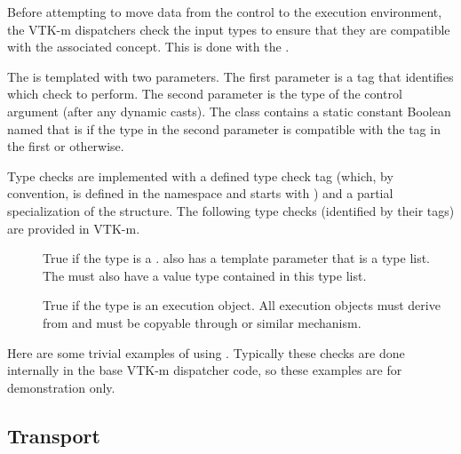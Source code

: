 
Before attempting to move data from the control to the execution
environment, the VTK-m dispatchers check the input types to ensure that
they are compatible with the associated \controlsignature concept. This is
done with the  .

The   is templated with two
parameters. The first parameter is a tag that identifies which check to
perform. The second parameter is the type of the control argument (after any
dynamic casts). The  class contains a static
constant Boolean named  that is  if the type
in the second parameter is compatible with the tag in the first or
 otherwise.

Type checks are implemented with a defined type check tag (which, by
convention, is defined in the \vtkmcontarg{} namespace and starts with
) and a partial specialization of the
 structure. The following type checks (identified by
their tags) are provided in VTK-m.

\begin{description}
\item[]  True if the
  type is a .  also
  has a template parameter that is a type list. The
   must also have a value type contained in
  this type list.
\item[]
   True if the type is an execution
  object. All execution objects must derive from
   and must be copyable through
   or similar mechanism.
\end{description}

Here are some trivial examples of using
. Typically these checks are done internally in
the base VTK-m dispatcher code, so these examples are for demonstration
only.



\subsection{Transport}
\label{sec:Transport}

